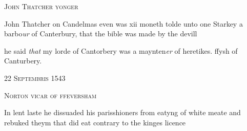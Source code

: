 \documentclass[12pt, a4paper]{book}
\begin{document}
               
               	
				\begin{center}  {\scshape John Thatcher yonger}  \end{center}
			
               	
               		
				\marginpar[\vspace{0.5cm}{\textcolor{Gray}{herecie}}]{}
			
               		
		\ifthenelse{\isodd{\thepage}}
		{\reversemarginpar}
		{\normalmarginpar}
		John Thatcher on Candelmas even was xii moneth
               			tolde unto one Starkey a barbo\textit{ur} of Canterbury, that
 the bible was made by the devill
               	
               	
				\marginpar[\vspace{0.5cm}{\textcolor{Gray}{n}}]{}
			
               	
		\ifthenelse{\isodd{\thepage}}
		{\reversemarginpar}
		{\normalmarginpar}
		he said \textit{that} my lorde of Cantorbery was a maynten\textit{er} of heretikes.
               		ffysh of Canturbery.
 

            
            
               
				\begin{center} \begin{large} {\scshape 
               	22 Septembris 1543
               } \end{large} \end{center}
			
               
               	
				\begin{center}  {\scshape Norton vicar of ffeversham}  \end{center}
			
               	
               		
				\marginpar[\vspace{0.5cm}{\textcolor{Gray}{lent}}]{}
			
               		
		\ifthenelse{\isodd{\thepage}}
		{\reversemarginpar}
		{\normalmarginpar}
		In lent laste he dissuaded his parisshioners from
 eatyng of white meate and rebuked theym that did eat
  contrary to the kinges licence
               	



\dotfill
						\newpage {} \subsection*{}  \subsection*{}
\end{document}
